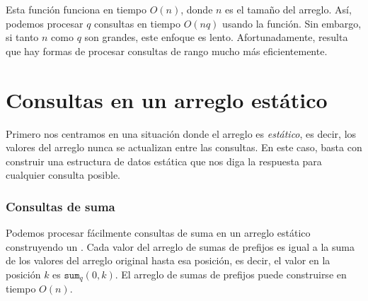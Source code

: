 Esta función funciona en tiempo $O(n)$,
donde $n$ es el tamaño del arreglo.
Así, podemos procesar $q$ consultas en tiempo $O(nq)$
usando la función.
Sin embargo, si tanto $n$ como $q$ son grandes, este enfoque
es lento. Afortunadamente, resulta que hay
formas de procesar consultas de rango mucho más eficientemente.

\section{Consultas en un arreglo estático}

Primero nos centramos en una situación donde
el arreglo es \emph{estático}, es decir,
los valores del arreglo nunca se actualizan entre las consultas.
En este caso, basta con construir
una estructura de datos estática que nos diga
la respuesta para cualquier consulta posible.

\subsubsection{Consultas de suma}


Podemos procesar fácilmente
consultas de suma en un arreglo estático
construyendo un .
Cada valor del arreglo de sumas de prefijos es igual
a la suma de los valores del arreglo original hasta esa posición,
es decir, el valor en la posición $k$ es $\texttt{sum}_q(0,k)$.
El arreglo de sumas de prefijos puede construirse en tiempo $O(n)$.

